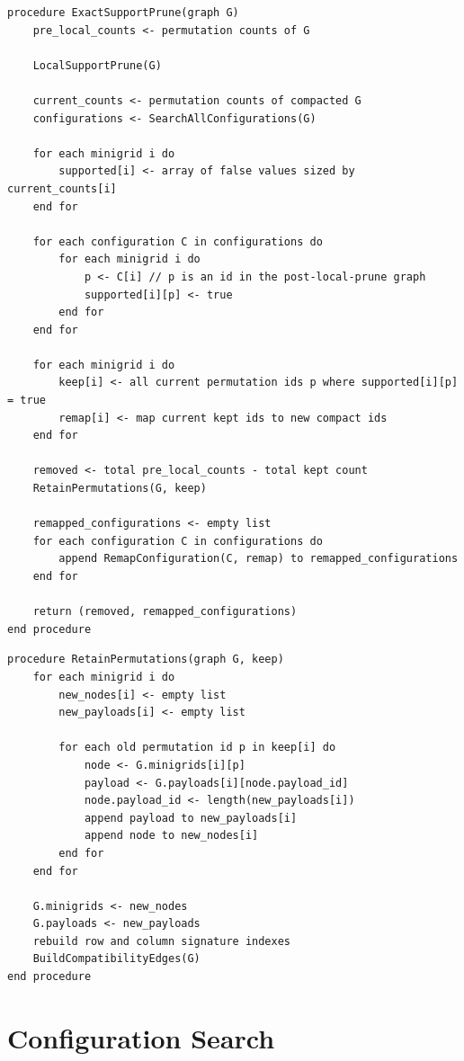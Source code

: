 \documentclass[11pt,a4paper]{article}
\begin{document}
\begin{lstlisting}[caption={Exact global support pruning}]
procedure ExactSupportPrune(graph G)
    pre_local_counts <- permutation counts of G

    LocalSupportPrune(G)

    current_counts <- permutation counts of compacted G
    configurations <- SearchAllConfigurations(G)

    for each minigrid i do
        supported[i] <- array of false values sized by current_counts[i]
    end for

    for each configuration C in configurations do
        for each minigrid i do
            p <- C[i] // p is an id in the post-local-prune graph
            supported[i][p] <- true
        end for
    end for

    for each minigrid i do
        keep[i] <- all current permutation ids p where supported[i][p] = true
        remap[i] <- map current kept ids to new compact ids
    end for

    removed <- total pre_local_counts - total kept count
    RetainPermutations(G, keep)

    remapped_configurations <- empty list
    for each configuration C in configurations do
        append RemapConfiguration(C, remap) to remapped_configurations
    end for

    return (removed, remapped_configurations)
end procedure
\end{lstlisting}

\begin{lstlisting}[caption={Retain permutations and rebuild graph indexes}]
procedure RetainPermutations(graph G, keep)
    for each minigrid i do
        new_nodes[i] <- empty list
        new_payloads[i] <- empty list

        for each old permutation id p in keep[i] do
            node <- G.minigrids[i][p]
            payload <- G.payloads[i][node.payload_id]
            node.payload_id <- length(new_payloads[i])
            append payload to new_payloads[i]
            append node to new_nodes[i]
        end for
    end for

    G.minigrids <- new_nodes
    G.payloads <- new_payloads
    rebuild row and column signature indexes
    BuildCompatibilityEdges(G)
end procedure
\end{lstlisting}

\section{Configuration Search}
\end{document}
